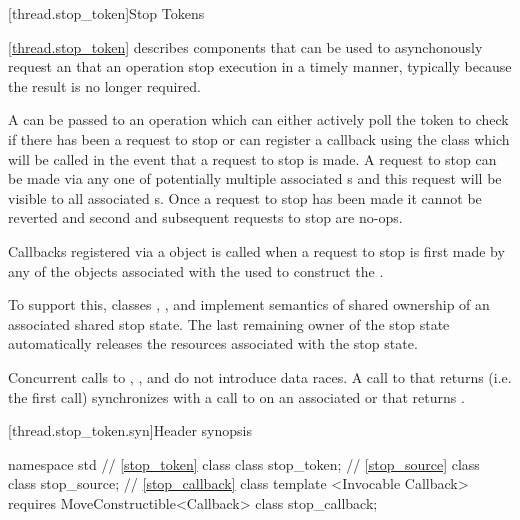 {\color{insertcolor}

[thread.stop_token]{Stop Tokens}

\pnum
\ref{thread.stop_token} describes components that can be used to
asynchonously request an that an operation stop execution in a timely
manner, typically because the result is no longer required.

\pnum
A  can be passed to an operation which can either
actively poll the token to check if there has been a request to stop
or can register a callback using the  class which
will be called in the event that a request to stop is made. A request
to stop can be made via any one of potentially multiple associated
s and this request will be visible to all associated
s. Once a request to stop has been made it cannot be
reverted and second and subsequent requests to stop are no-ops.

\pnum
Callbacks registered via a  object is called when
a request to stop is first made by any of the  objects
associated with the  used to construct the .

\pnum
To support this, classes , , and 
implement semantics of shared ownership of an associated shared stop state.
The last remaining owner of the stop state automatically 
releases the resources associated with the stop state.

\pnum
Concurrent calls to , ,
and 
do not introduce data races. 
A call to  that returns  (i.e. the first call)
synchronizes with a call to  on an associated 
or  that returns .

[thread.stop_token.syn]{Header  synopsis}
%

\begin{codeblock}
namespace std {
  // \ref{stop_token} class 
  class stop_token;
  // \ref{stop_source} class 
  class stop_source;
  // \ref{stop_callback} class 
  template <Invocable Callback>
    requires MoveConstructible<Callback>
  class stop_callback;
}
\end{codeblock}


}
